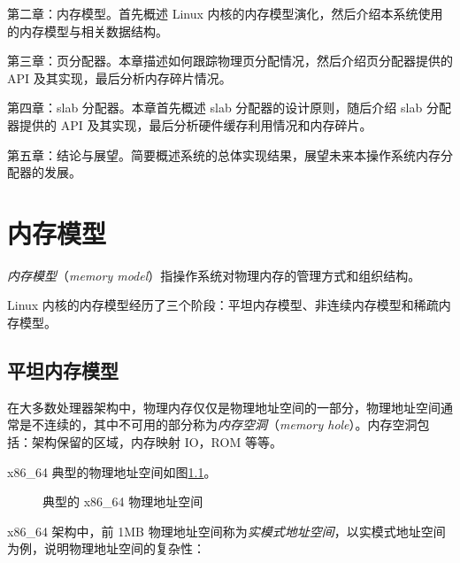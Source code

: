 \documentclass[AutoFakeBold]{LZUThesis}
\begin{document}
\begin{sloppypar}
第二章：内存模型。首先概述 Linux
内核的内存模型演化，然后介绍本系统使用的内存模型与相关数据结构。

第三章：页分配器。本章描述如何跟踪物理页分配情况，然后介绍页分配器提供的
API 及其实现，最后分析内存碎片情况。

第四章：slab 分配器。本章首先概述 slab 分配器的设计原则，随后介绍 slab
分配器提供的 API 及其实现，最后分析硬件缓存利用情况和内存碎片。

第五章：结论与展望。简要概述系统的总体实现结果，展望未来本操作系统内存分配器的发展。



\chapter{内存模型}

\emph{内存模型}（\emph{memory
model}）指操作系统对物理内存的管理方式和组织结构。

Linux
内核的内存模型经历了三个阶段：平坦内存模型、非连续内存模型和稀疏内存模型。


\section{平坦内存模型}

在大多数处理器架构中，物理内存仅仅是物理地址空间的一部分，物理地址空间通常是不连续的，其中不可用的部分称为\emph{内存空洞}（\emph{memory
hole}）。内存空洞包括：架构保留的区域，内存映射 IO，ROM 等等。

x86\_64 典型的物理地址空间如图\ref{figure:x86_64-physical-address-space}。

\begin{figure}
\centering

\caption{典型的 x86\_64 物理地址空间}
\label{figure:x86_64-physical-address-space}
\end{figure}

x86\_64 架构中，前 1MB
物理地址空间称为\emph{实模式地址空间}，以实模式地址空间为例，说明物理地址空间的复杂性：


\end{sloppypar}
\end{document}
